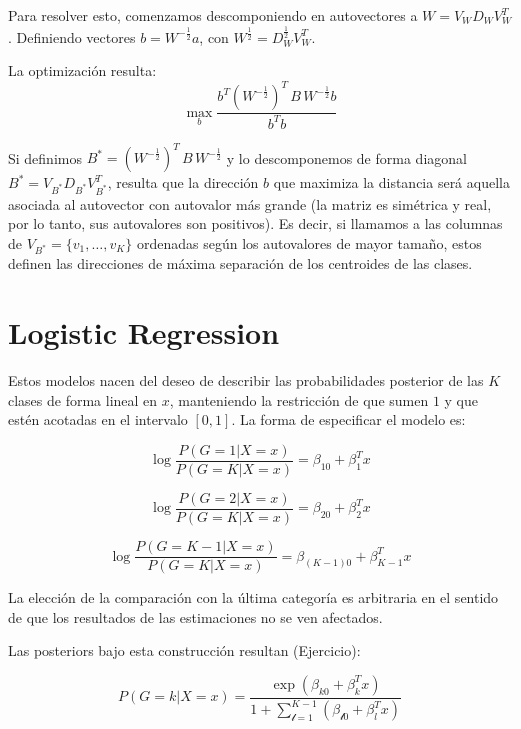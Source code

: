 \documentclass[aps,onecolumn,12pt,notitlepage]{revtex4-1}
\begin{document}
Para resolver esto, comenzamos descomponiendo en autovectores a $W = V_{W} D_{W} V_{W}^{T}$. Definiendo vectores $b = W^{-\frac{1}{2}} a$, con $W^{\frac{1}{2}} = D_{W}^{\frac{1}{2}} V_{W}^{T}$.

La optimización resulta:
\begin{equation}
\max_{b} \frac{b^{T}(W^{-\frac{1}{2}})^{T}\,B\,W^{-\frac{1}{2}}b}{b^{T}b}
\end{equation}

Si definimos $B^{*} = (W^{-\frac{1}{2}})^{T}\,B\,W^{-\frac{1}{2}}$ y lo descomponemos de forma diagonal $B^{*} = V_{B^{*}} D_{B^{*}} V^{T}_{B^{*}}$, resulta que la dirección $b$ que maximiza la distancia será aquella asociada al autovector con autovalor más grande (la matriz es simétrica y real, por lo tanto, sus autovalores son positivos). Es decir, si llamamos a las columnas de $V_{B^{*}} = \{ v_{1},\dots,v_{K}\}$ ordenadas según los autovalores de mayor tamaño, estos definen las direcciones de máxima separación de los centroides de las clases.

\section{Logistic Regression}

Estos modelos nacen del deseo de describir las probabilidades posterior de las $K$ clases de forma lineal en $x$, manteniendo la restricción de que sumen $1$ y que estén acotadas en el intervalo $[0,1]$. La forma de especificar el modelo es:

\begin{equation}
\log \frac{P(G=1|X=x)}{P(G=K|X=x)}  = \beta_{10} + \beta_{1}^{T}x
\end{equation}

\begin{equation}
\log \frac{P(G=2|X=x)}{P(G=K|X=x)}  = \beta_{20} + \beta_{2}^{T}x
\end{equation}

\begin{equation}
\log \frac{P(G=K-1|X=x)}{P(G=K|X=x)} = \beta_{(K-1)0} + \beta_{K-1}^{T}x
\end{equation}

La elección de la comparación con la última categoría es arbitraria en el sentido de que los resultados de las estimaciones no se ven afectados.

Las posteriors bajo esta construcción resultan (Ejercicio):

\begin{equation}
P(G=k|X=x) = \frac{\exp (\beta_{k0} + \beta_{k}^{T}x)}{1 + \sum_{\mathcal{l}= 1}^{K-1}(\beta_{\mathcal{l}0}+ \beta_{l}^{T}x)}
\end{equation}
\end{document}
